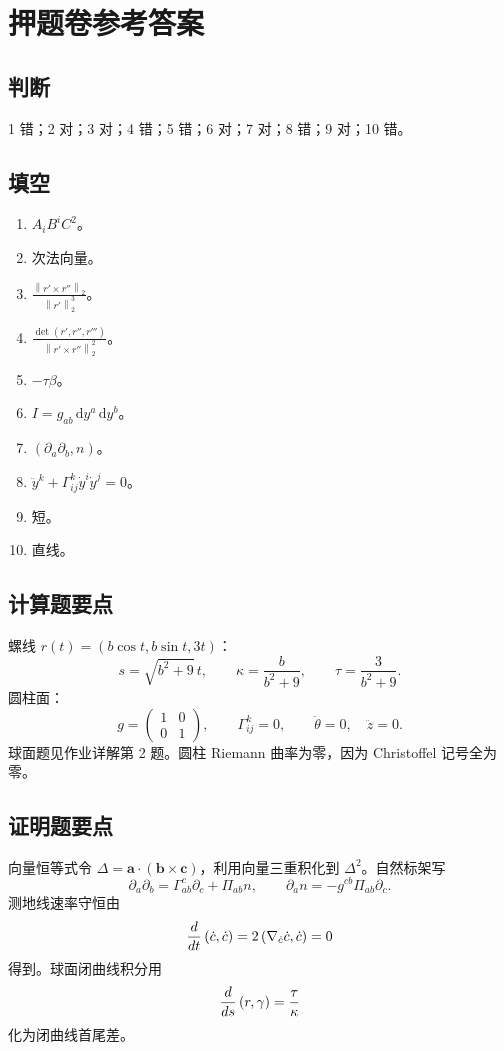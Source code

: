 \documentclass[UTF8,12pt,a4paper]{ctexart}
\newcommand{\dd}{\,\mathrm d}
\newcommand{\vct}[1]{\boldsymbol{#1}}
\newcommand{\norm}[1]{\left\lVert #1\right\rVert}
\newcommand{\inner}[2]{\left(#1,#2\right)}
\begin{document}
\section{押题卷参考答案}
\subsection*{判断}
1 错；2 对；3 对；4 错；5 错；6 对；7 对；8 错；9 对；10 错。

\subsection*{填空}
\begin{enumerate}
\item $A_iB^iC^2$。
\item 次法向量。
\item $\displaystyle \frac{\norm{r'\times r''}_2}{\norm{r'}_2^3}$。
\item $\displaystyle \frac{\det(r',r'',r''')}{\norm{r'\times r''}_2^2}$。
\item $-\tau\beta$。
\item $I=g_{ab}\dd y^a\dd y^b$。
\item $\inner{\partial_a\partial_b}{n}$。
\item $\ddot y^k+\Gamma^k_{ij}\dot y^i\dot y^j=0$。
\item 短。
\item 直线。
\end{enumerate}

\subsection*{计算题要点}
螺线 $r(t)=(b\cos t,b\sin t,3t)$：
\[
s=\sqrt{b^2+9}\,t,\qquad
\kappa=\frac{b}{b^2+9},\qquad
\tau=\frac{3}{b^2+9}.
\]
圆柱面：
\[
g=\begin{pmatrix}1&0\\0&1\end{pmatrix},\qquad
\Gamma^k_{ij}=0,\qquad
\ddot\theta=0,\quad\ddot z=0.
\]
球面题见作业详解第 2 题。圆柱 Riemann 曲率为零，因为 Christoffel 记号全为零。

\subsection*{证明题要点}
向量恒等式令 $\Delta=\vct a\cdot(\vct b\times\vct c)$，利用向量三重积化到 $\Delta^2$。自然标架写
\[
\partial_a\partial_b=\Gamma^c_{ab}\partial_c+\Pi_{ab}n,\qquad
\partial_an=-g^{cb}\Pi_{ab}\partial_c.
\]
测地线速率守恒由
\[
{d\over dt}\inner{\dot c}{\dot c}=2\inner{\nabla_{\dot c}\dot c}{\dot c}=0
\]
得到。球面闭曲线积分用
\[
{d\over ds}\inner{r}{\gamma}={\tau\over\kappa}
\]
化为闭曲线首尾差。
\end{document}
